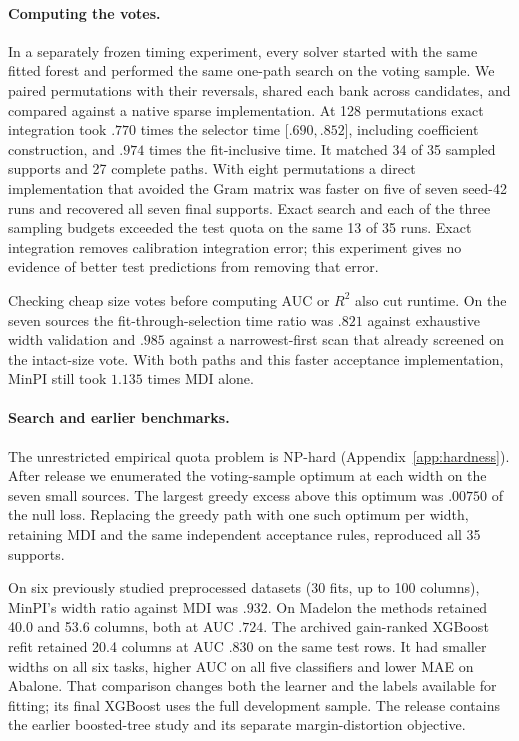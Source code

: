 \paragraph{Computing the votes.}
In a separately frozen timing experiment, every solver started with the
same fitted forest and performed the same one-path search on the voting
sample. We paired permutations with their reversals, shared each bank
across candidates, and compared against a native sparse implementation.
At 128 permutations exact integration took $.770$ times the selector time
[$.690,.852$], including coefficient construction, and $.974$ times the
fit-inclusive time. It matched 34 of 35 sampled supports and 27 complete
paths. With eight permutations a direct implementation that avoided the
Gram matrix was faster on five of seven seed-42 runs and recovered all
seven final supports. Exact search and each of the three sampling budgets
exceeded the test quota on the same 13 of 35 runs. Exact integration removes
calibration integration error; this experiment gives no evidence of
better test predictions from removing that error.

Checking cheap size votes before computing AUC or $R^2$ also cut runtime.
On the seven sources the fit-through-selection time ratio was $.821$ against
exhaustive width validation and $.985$ against a narrowest-first scan that
already screened on the intact-size vote. With both paths and this faster
acceptance implementation, MinPI still took $1.135$ times MDI alone.



\paragraph{Search and earlier benchmarks.}
The unrestricted empirical quota problem is NP-hard
(Appendix~\ref{app:hardness}). After release we enumerated the
voting-sample optimum at each width on the seven small sources. The
largest greedy excess above this optimum was $.00750$ of the null loss.
Replacing the greedy path with one such optimum per width, retaining
MDI and the same independent acceptance rules, reproduced all 35 supports.

On six previously studied preprocessed datasets (30 fits, up to 100
columns), MinPI's width ratio against MDI was $.932$. On Madelon the
methods retained 40.0 and 53.6 columns, both at AUC $.724$. The archived
gain-ranked XGBoost refit retained 20.4 columns at AUC $.830$ on the same
test rows. It had smaller widths on all six tasks, higher AUC on all five
classifiers and lower MAE on Abalone. That comparison changes both the
learner and the labels available for fitting; its final XGBoost uses the
full development sample. The release contains the earlier boosted-tree
study and its separate margin-distortion objective.


